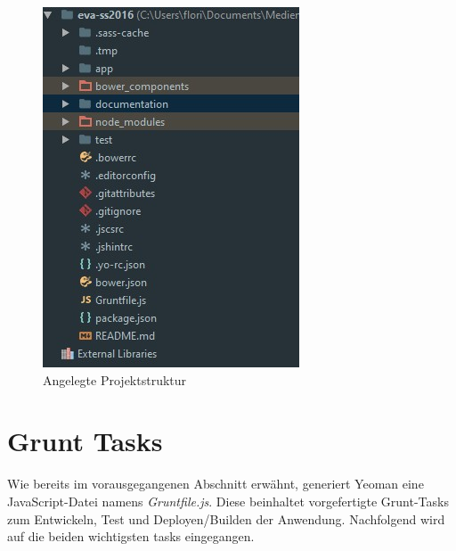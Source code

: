 \begin{figure}[H]
    \centering
    \begin{minipage}[t]{0.49\linewidth}
        \centering
        \includegraphics[width=\linewidth]{images/project_structure.jpg}
        \caption{Angelegte Projektstruktur}
        \label{project_structure}
    \end{minipage}
\end{figure}


\section{Grunt Tasks}
Wie bereits im vorausgegangenen Abschnitt erwähnt, generiert Yeoman eine JavaScript-Datei namens \textit{Gruntfile.js}. Diese beinhaltet vorgefertigte Grunt-Tasks zum Entwickeln, Test und
Deployen/Builden der Anwendung. Nachfolgend wird auf die beiden wichtigsten tasks eingegangen.

